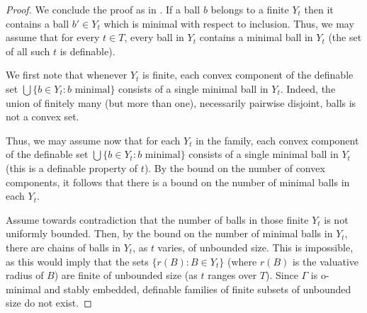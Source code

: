 \documentclass[11pt]{amsart}
\theoremstyle{definition}
\newcommand{\0}{\emptyset}
\begin{document}
\begin{proof}
    

We conclude the proof as in \cite[\S 3]{JohCminimalexist}.
If a ball $b$ belongs to a finite $Y_t$ then it contains a ball $b'\in Y_t$ which is minimal with respect to inclusion. Thus, we may assume that for every $t\in T$, every ball in $Y_t$ contains a minimal ball in $Y_t$ (the set of all such $t$ is definable).

We first note that whenever $Y_t$ is finite, each convex component of the definable set $\bigcup\{b\in Y_t: b \mbox{ minimal} \}$ consists of a single minimal ball in $Y_t$. Indeed, the union of finitely many (but more than one), necessarily pairwise disjoint, balls is not a convex set. 

Thus, we may assume now that for each $Y_t$ in the family, each convex component of the definable set $\bigcup\{b\in Y_t: b \mbox{ minimal} \}$ consists of a single minimal ball in $Y_t$ (this is a definable property of $t$). By the bound on the number of convex components, it follows that there is a bound on the number of minimal balls in each $Y_t$. 




Assume towards contradiction that the number of balls in those finite $Y_t$ is not uniformly bounded.  Then, by the bound on the number of minimal balls in $Y_t$,  there are chains of balls in $Y_t$, as $t$ varies,  of unbounded size. This is impossible, as this would imply that the sets  $\{r(B): B\in Y_t\}$ (where $r(B)$ is the valuative radius of $B$) are finite of unbounded size (as $t$ ranges over $T$). Since $\Gamma$ is o-minimal and stably embedded,  definable families of finite subsets of unbounded size do not exist. 
\end{proof}
\end{document}
